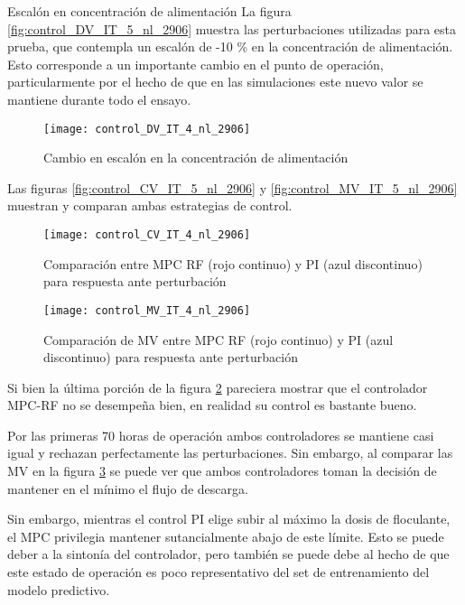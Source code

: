 \documentclass{beamer}
\begin{document}
\begin{myFrame}{Escalón en concentración de alimentación}
La figura \ref{fig:control_DV_IT_5_nl_2906} muestra las perturbaciones utilizadas para esta prueba, que contempla un escalón de -10 \% en la concentración de alimentación. Esto corresponde a un importante cambio en el punto de operación, particularmente por el hecho de que en las simulaciones este nuevo valor se mantiene durante todo el ensayo. 

\framebreak
\begin{figure}[H]
\centering
\texttt{[image: control\_DV\_IT\_4\_nl\_2906]}
\caption{Cambio en escalón en la concentración de alimentación}
\label{fig:control_DV_IT_4_nl_2906}
\end{figure}

\framebreak


Las figuras \ref{fig:control_CV_IT_5_nl_2906} y \ref{fig:control_MV_IT_5_nl_2906} muestran y comparan ambas estrategias de control.

\framebreak

\begin{figure}[H]
\centering
\texttt{[image: control\_CV\_IT\_4\_nl\_2906]}
\caption{Comparación entre MPC RF (rojo continuo) y PI (azul discontinuo) para respuesta ante perturbación}
\label{fig:control_CV_IT_4_nl_2906}
\end{figure}

\framebreak
\begin{figure}[H]
\centering
\texttt{[image: control\_MV\_IT\_4\_nl\_2906]}
\caption{Comparación de MV entre MPC RF (rojo continuo) y PI (azul discontinuo) para respuesta ante perturbación}
\label{fig:control_MV_IT_4_nl_2906}
\end{figure}

\framebreak

Si bien la última porción de la figura \ref{fig:control_CV_IT_4_nl_2906} pareciera mostrar que el controlador MPC-RF no se desempeña bien, en realidad su control es bastante bueno. 

Por las primeras 70 horas de operación ambos controladores se mantiene casi igual y rechazan perfectamente las perturbaciones. Sin embargo, al comparar las MV en la figura \ref{fig:control_MV_IT_4_nl_2906} se puede ver que ambos controladores toman la decisión de mantener en el mínimo el flujo de descarga.


Sin embargo, mientras el control PI elige subir al máximo la dosis de floculante, el MPC privilegia mantener sutancialmente abajo de este límite. Esto se puede deber a la sintonía del controlador, pero también se puede debe al hecho de que este estado de operación es poco representativo del set de entrenamiento del modelo predictivo.



\end{myFrame}
\end{document}
